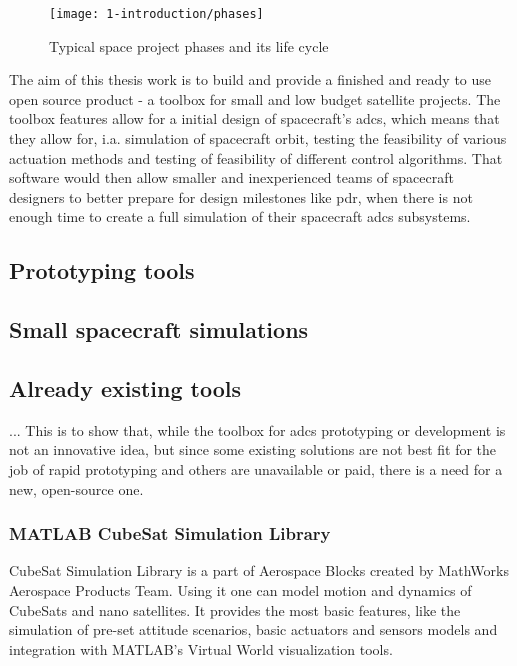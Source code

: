     \begin{figure}[h]
        \centering
        \texttt{[image: 1-introduction/phases]}
        \caption{Typical space project phases and its life cycle\cite{nguyen2000effective}}
        \label{fig:phases}
    \end{figure}

    The aim of this thesis work is to build and provide a finished and ready to use open source product - a toolbox for small and low budget satellite projects.  The toolbox features allow for a initial design of spacecraft's \ac{adcs}, which means that they allow for, i.a. simulation of spacecraft orbit, testing the feasibility of various actuation methods and testing of feasibility of different control algorithms.  That software would then allow smaller and inexperienced teams of spacecraft designers to better prepare for design milestones like \ac{pdr}, when there is not enough time to create a full simulation of their spacecraft \ac{adcs} subsystems.

\subsection{Prototyping tools}

\subsection{Small spacecraft simulations}

\subsection{Already existing tools}
    ... This is to show that, while the toolbox for \ac{adcs} prototyping or development is not an innovative idea, but since some existing solutions are not best fit for the job of rapid prototyping and others are unavailable or paid, there is a need for a new, open-source one.
    

    \subsubsection{MATLAB CubeSat Simulation Library}
        CubeSat Simulation Library is a part of Aerospace Blocks created by MathWorks Aerospace Products Team. Using it one can model motion and dynamics of CubeSats and nano satellites. It provides the most basic features, like the simulation of pre-set attitude scenarios, basic actuators and sensors models and integration with MATLAB's Virtual World visualization tools.
        

